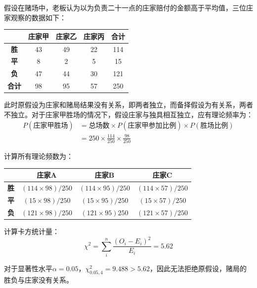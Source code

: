 \documentclass[11pt]{article}
\begin{document}
\begin{example}
    假设在赌场中，老板认为以为负责二十一点的庄家赔付的金额高于平均值，三位庄家观察的数据如下：
    \begin{table}[H]
    \centering
    \begin{tabular}{@{}ccccc@{}}
    \toprule
    & \textbf{庄家甲} & \textbf{庄家乙} & \textbf{庄家丙} & \textbf{合计} \\ \midrule
    \textbf{胜}  & 43 & 49 & 22 & 114 \\
    \textbf{平}  & 8 & 2 & 5 & 15 \\
    \textbf{负}  & 47 & 44 & 30 & 121 \\
    \textbf{合计} & 98 & 95 & 57 & 250 \\ \bottomrule
    \end{tabular}
    \end{table}

    此时原假设为庄家和赌局结果没有关系，即两者独立，而备择假设为有关系，两者不独立。对于庄家甲胜场的情况下，假设庄家与独具相互独立，应有理论频率为：
    \begin{align*}
        P(\text{庄家甲胜场}) &= \text{总场数} \times P(\text{庄家甲参加比例}) \times P(\text{胜场比例}) \\
        &= 250 \times \frac{114}{250} \times \frac{98}{250}
    \end{align*}

    计算所有理论频数为：
    \begin{table}[H]
    \centering
    \begin{tabular}{@{}cccc@{}}
    \toprule
    & \textbf{庄家A}& \textbf{庄家B} & \textbf{庄家C} \\ \midrule
    \textbf{胜} & $(114\times 98)/250$ & $(114\times 95)/250$ & $(114\times 57)/250$ \\
    \textbf{平} & $(15\times 98)/250$  & $(15\times 95)/250$  & $(15\times 57)/250$  \\
    \textbf{负} & $(121\times 98)/250$ & $(121\times 95)250$  & $(121\times 57)/250$ \\ \bottomrule
    \end{tabular}
    \end{table}

    计算卡方统计量：
    \begin{equation*}
        \chi^2 = \sum_i^n \frac{(O_i - E_i)^2}{E_i} = 5.62
    \end{equation*}

    对于显著性水平$\alpha=0.05$，$\chi^2_{0.05,4} = 9.488 > 5.62$，因此无法拒绝原假设，赌局的胜负与庄家没有关系。
\end{example}
\end{document}
